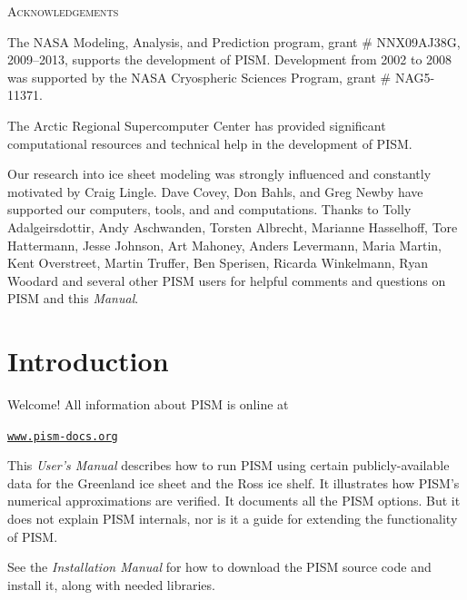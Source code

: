 \documentclass[11pt,final]{amsart}
\renewcommand{\t}[1]{\texttt{#1}}
\begin{document}
\centerline{\textsc{Acknowledgements}}
\bigskip

The NASA Modeling, Analysis, and Prediction program, grant \# NNX09AJ38G, 2009--2013, supports the development of PISM.  Development from 2002 to 2008 was supported by the NASA Cryospheric Sciences Program, grant \# NAG5-11371.

The Arctic Regional Supercomputer Center has provided significant computational resources and technical help in the development of PISM.

Our research into ice sheet modeling was strongly influenced and constantly motivated by Craig Lingle.  Dave Covey, Don Bahls, and Greg Newby have supported our computers, tools, and and computations.  Thanks to Tolly Adalgeirsdottir, Andy Aschwanden, Torsten Albrecht, Marianne Hasselhoff, Tore Hattermann, Jesse Johnson, Art Mahoney, Anders Levermann, Maria Martin, Kent Overstreet, Martin Truffer, Ben Sperisen, Ricarda Winkelmann, Ryan Woodard and several other PISM users for helpful comments and questions on PISM and this \emph{Manual}.

\newpage
\setcounter{tocdepth}{2}
\small
\tableofcontents
\normalsize

\newpage
\section{Introduction}\label{sect:intro}

Welcome!  All information about PISM is online at
\begin{center}
  \href{http://www.pism-docs.org}{\t{www.pism-docs.org}}
\end{center}

This \emph{User's Manual} describes how to run PISM using certain publicly-available data for the Greenland ice sheet and the Ross ice shelf.  It illustrates how PISM's numerical approximations are verified.  It documents all the PISM options.  But it does not explain PISM internals, nor is it a guide for extending the functionality of PISM.

See the \emph{Installation Manual} for how to download the PISM source code and install it, along with needed libraries.
\end{document}
